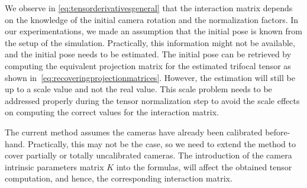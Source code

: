We observe in \eqref{eq:tensorderivativesgeneral} that the interaction matrix depends on the knowledge of the initial camera rotation and the normalization factors. In our experimentations, we made an assumption that the initial pose is known from the setup of the simulation. Practically, this information might not be available, and the initial pose needs to be estimated. The initial pose can be retrieved by computing the equivalent projection matrix for the estimated trifocal tensor as shown in~\eqref{eq:recoveringprojectionmatrices}. However, the estimation will still be up to a scale value and not the real value. This scale problem needs to be addressed properly during the tensor normalization step to avoid the scale effects on computing the correct values for the interaction matrix.

The current method assumes the cameras have already been calibrated before-hand. Practically, this may not be the case, so we need to extend the method to cover partially or totally uncalibrated cameras. The introduction of the camera intrinsic parameters matrix $K$ into the formulas, will affect the obtained tensor computation, and hence, the corresponding interaction matrix.
